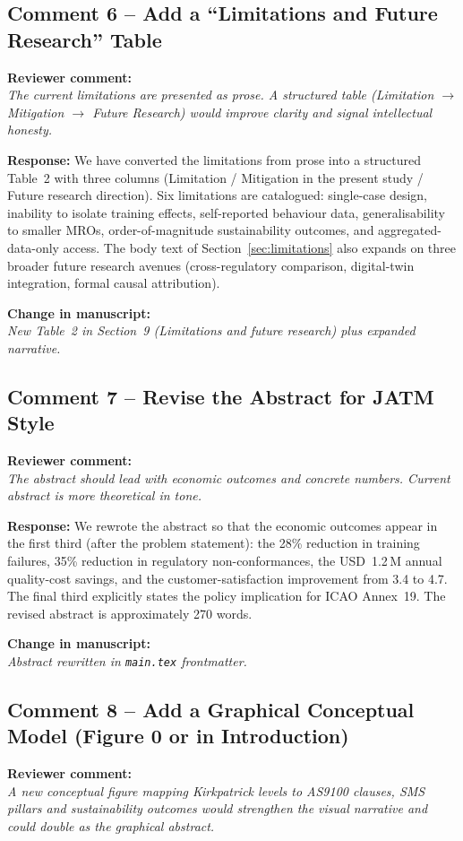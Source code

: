 \documentclass[11pt,a4paper]{article}
\newcommand{\comment}[1]{\par\smallskip\noindent\textbf{\color{blue!60!black}Reviewer comment:}\\ \emph{#1}\par\smallskip}
\newcommand{\response}[1]{\noindent\textbf{Response:} #1\par\smallskip}
\newcommand{\change}[1]{\par\noindent\textbf{\color{green!50!black}Change in manuscript:}\\ \emph{#1}\par\smallskip}
\begin{document}
\subsection*{Comment 6 -- Add a ``Limitations and Future Research'' Table}
\comment{The current limitations are presented as prose. A structured table
(Limitation $\to$ Mitigation $\to$ Future Research) would improve clarity
and signal intellectual honesty.}

\response{We have converted the limitations from prose into a structured
Table~2 with three columns (Limitation / Mitigation in the present study /
Future research direction). Six limitations are catalogued: single-case
design, inability to isolate training effects, self-reported behaviour
data, generalisability to smaller MROs, order-of-magnitude sustainability
outcomes, and aggregated-data-only access. The body text of
Section~\ref{sec:limitations} also expands on three broader future
research avenues (cross-regulatory comparison, digital-twin integration,
formal causal attribution).}

\change{New Table~2 in Section~9 (Limitations and future research) plus
expanded narrative.}

\subsection*{Comment 7 -- Revise the Abstract for JATM Style}
\comment{The abstract should lead with economic outcomes and concrete
numbers. Current abstract is more theoretical in tone.}

\response{We rewrote the abstract so that the economic outcomes appear in
the first third (after the problem statement): the 28\% reduction in
training failures, 35\% reduction in regulatory non-conformances, the
USD~1.2\,M annual quality-cost savings, and the customer-satisfaction
improvement from 3.4 to 4.7. The final third explicitly states the policy
implication for ICAO Annex~19. The revised abstract is approximately 270
words.}

\change{Abstract rewritten in \texttt{main.tex} frontmatter.}

\subsection*{Comment 8 -- Add a Graphical Conceptual Model (Figure 0 or in Introduction)}
\comment{A new conceptual figure mapping Kirkpatrick levels to AS9100
clauses, SMS pillars and sustainability outcomes would strengthen the
visual narrative and could double as the graphical abstract.}
\end{document}
